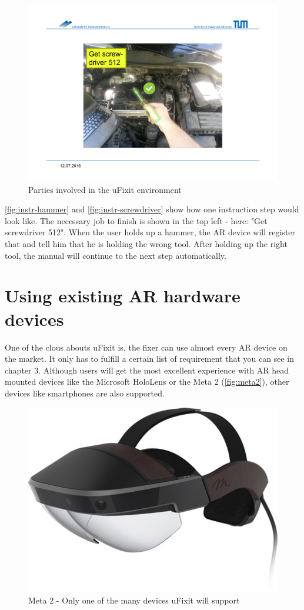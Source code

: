 		\begin{figure}[H]
			\includegraphics[width=\textwidth, trim=4cm 3cm 4cm 4cm, clip]{../images/instr-screwdriver.pdf}
			\centering
			\caption{Parties involved in the uFixit environment}
			\label{fig:instr-screwdriver}
		\end{figure}
		
		\autoref{fig:instr-hammer} and \autoref{fig:instr-screwdriver} show how one instruction step would look like. The necessary job to finish is shown in the top left - here: "Get screwdriver 512". When the user holds up a hammer, the AR device will register that and tell him that he is holding the wrong tool. After holding up the right tool, the manual will continue to the next step automatically.
		
	
	\section{Using existing AR hardware devices}
	
		One of the clous abouts uFixit is, the fixer can use almost every AR device on the market. It only has to fulfill a certain list of requirement that you can see in chapter 3. Although users will get the most excellent experience with AR head mounted devices like the Microsoft HoloLens or the Meta 2 (\autoref{fig:meta2}), other devices like smartphones are also supported.
		
		\begin{figure}[H]
			\centering
			\includegraphics[width=0.5\linewidth]{../images/meta2.png}
			\caption{Meta 2 - Only one of the many devices uFixit will support}
			\label{fig:meta2}
		\end{figure}
		
